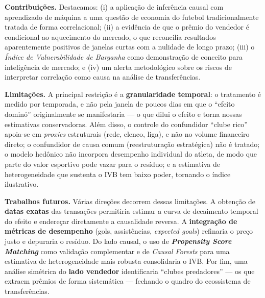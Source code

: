 \documentclass[12pt]{article}
\begin{document}
\textbf{Contribuições.} Destacamos: (i) a aplicação de inferência causal com aprendizado de máquina
a uma questão de economia do futebol tradicionalmente tratada de forma correlacional; (ii) a
evidência de que o prêmio do vendedor é condicional ao aquecimento do mercado, o que reconcilia
resultados aparentemente positivos de janelas curtas com a nulidade de longo prazo; (iii) o
\textit{Índice de Vulnerabilidade de Barganha} como demonstração de conceito para inteligência de
mercado; e (iv) um alerta metodológico sobre os riscos de interpretar correlação como causa na
análise de transferências.

\textbf{Limitações.} A principal restrição é a \textbf{granularidade temporal}: o tratamento é
medido por temporada, e não pela janela de poucos dias em que o ``efeito dominó'' originalmente se
manifestaria — o que dilui o efeito e torna nossas estimativas conservadoras. Além disso, o controle
do confundidor ``clube rico'' apoia-se em \textit{proxies} estruturais (rede, elenco, liga), e não no
volume financeiro direto; o confundidor de causa comum (reestruturação estratégica) não é tratado; o
modelo hedônico não incorpora desempenho individual do atleta, de modo que parte do valor esportivo
pode vazar para o resíduo; e a estimativa de heterogeneidade que sustenta o IVB tem baixo poder,
tornando o índice ilustrativo.

\textbf{Trabalhos futuros.} Várias direções decorrem dessas limitações. A obtenção de \textbf{datas
exatas} das transações permitiria estimar a curva de decaimento temporal do efeito e endereçar
diretamente a causalidade reversa. A \textbf{integração de métricas de desempenho} (gols,
assistências, \textit{expected goals}) refinaria o preço justo e depuraria o resíduo. Do lado
causal, o uso de \textbf{\textit{Propensity Score Matching}} como validação complementar e de
\textit{Causal Forests} para uma estimativa de heterogeneidade mais robusta consolidaria o IVB.
Por fim, uma análise simétrica do \textbf{lado vendedor} identificaria ``clubes predadores'' — os que
extraem prêmios de forma sistemática — fechando o quadro do ecossistema de transferências.




\end{document}
